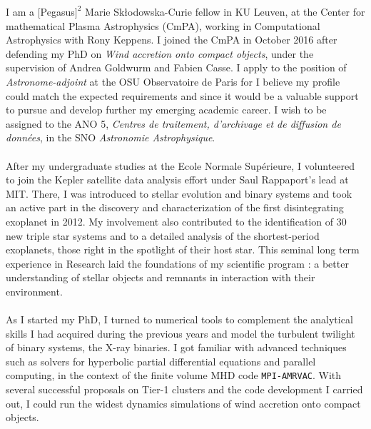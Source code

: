\documentclass[12pt]{letter}
\begin{document}
\begin{letter} {}
\hspace*{0.5cm} I am a $[$Pegasus$]^2$ Marie Sk\l{}odowska-Curie fellow in KU Leuven, at the Center for mathematical Plasma Astrophysics (CmPA), working in Computational Astrophysics with Rony Keppens. I joined the CmPA in October 2016 after defending my PhD on \textit{Wind accretion onto compact objects}, under the supervision of Andrea Goldwurm and Fabien Casse. I apply to the position of \textit{Astronome-adjoint} at the OSU Observatoire de Paris for I believe my profile could match the expected requirements and since it would be a valuable support to pursue and develop further my emerging academic career. I wish to be assigned to the ANO 5, \textit{Centres de traitement, d'archivage et de diffusion de donn\'ees}, in the SNO \textit{Astronomie Astrophysique}. \\ \\
\hspace*{0.5cm} After my undergraduate studies at the Ecole Normale Sup\'erieure, I volunteered to join the Kepler satellite data analysis effort under Saul Rappaport's lead at MIT. There, I was introduced to stellar evolution and binary systems and took an active part in the discovery and characterization of the first disintegrating exoplanet in 2012. My involvement also contributed to the identification of 30 new triple star systems and to a detailed analysis of the shortest-period exoplanets, those right in the spotlight of their host star. This seminal long term experience in Research laid the foundations of my scientific program : a better understanding of stellar objects and remnants in interaction with their environment.\\ \\
\hspace*{0.5cm} As I started my PhD, I turned to numerical tools to complement the analytical skills I had acquired during the previous years and model the turbulent twilight of binary systems, the X-ray binaries. I got familiar with advanced techniques such as solvers for hyperbolic partial differential equations and parallel computing, in the context of the finite volume MHD code \texttt{MPI-AMRVAC}. With several successful proposals on Tier-1 clusters and the code development I carried out, I could run the widest dynamics simulations of wind accretion onto compact objects.\\

\newpage 



\end{letter}
\end{document}
